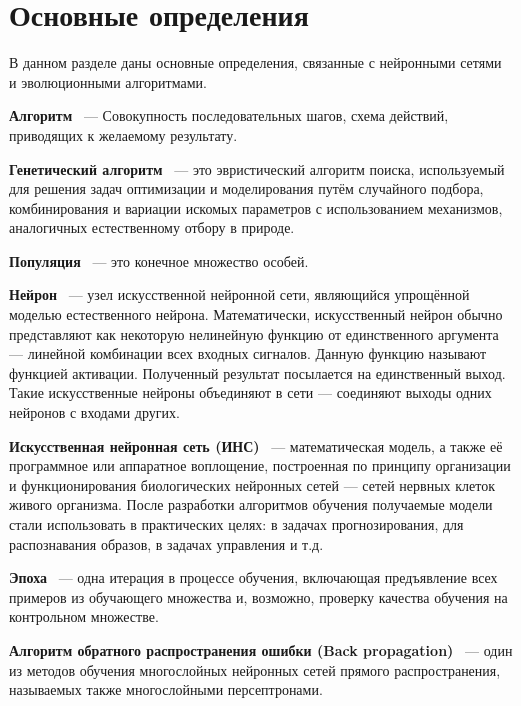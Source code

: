 \section{Основные определения}
\indent \indent В данном разделе даны основные определения, связанные с нейронными сетями и эволюционными алгоритмами.

 \textbf{Алгоритм} ~--- Совокупность последовательных шагов, схема действий, приводящих к желаемому результату. 

 \textbf{Генетический алгоритм} ~--- это эвристический алгоритм поиска, используемый для решения задач оптимизации и моделирования путём случайного подбора, комбинирования и вариации искомых параметров с использованием механизмов, аналогичных естественному отбору в природе.

 \textbf{Популяция} ~--- это конечное множество особей.

 \textbf{Нейрон} ~--- узел искусственной нейронной сети, являющийся упрощённой моделью естественного нейрона. Математически, искусственный нейрон обычно представляют как некоторую нелинейную функцию от единственного аргумента — линейной комбинации всех входных сигналов. Данную функцию называют функцией активации. Полученный результат посылается на единственный выход. Такие искусственные нейроны объединяют в сети — соединяют выходы одних нейронов с входами других. 

 \textbf{Искусственная нейронная сеть (ИНС)}  ~--- математическая модель, а также её программное или аппаратное воплощение, построенная по принципу организации и функционирования биологических нейронных сетей — сетей нервных клеток живого организма. После разработки алгоритмов обучения получаемые модели стали использовать в практических целях: в задачах прогнозирования, для распознавания образов, в задачах управления и т.д. 

 \textbf{Эпоха} ~--- одна итерация в процессе обучения, включающая предъявление всех примеров из обучающего множества и, возможно, проверку качества обучения на контрольном множестве. 

 \textbf{Алгоритм обратного распространения ошибки (Back propagation)} ~--- один из методов обучения многослойных нейронных сетей прямого распространения, называемых также многослойными персептронами.